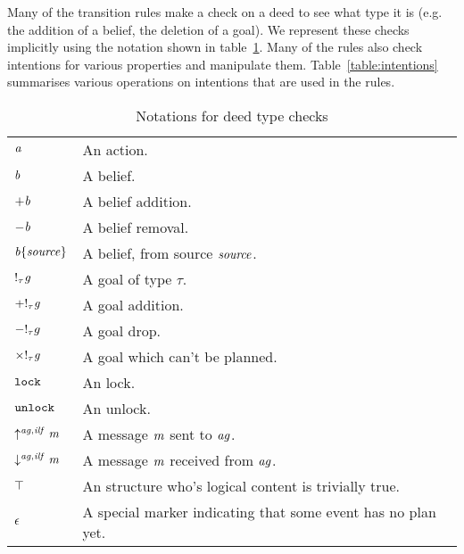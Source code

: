Many of the transition rules make a check on a deed to see what type
it is (e.g. the addition of a belief, the deletion of a goal).  We
represent these checks implicitly using the notation shown in table~\ref{table:deeds}.  Many of the rules also check intentions for various properties and manipulate them.  Table~\ref{table:intentions} summarises various operations on intentions that are used in the rules.

\begin{table}
\begin{tabular}{ll} \hline
$\mathit{a}$ & An action. \\

$\mathit{b}$ & A belief. \\

$+\mathit{b}$ & A belief addition. \\

$-\mathit{b}$ & A belief removal. \\

$\mathit{b}\{\mathit{source}\}$ & A belief, from source $\mathit{source}$. \\

$!_{\tau}\mathit{g}$ & A goal of type $\tau$\index{goal type}. \\

$\mathit{+!_{\tau}g}$ & A goal addition. \\

$\mathit{-!}_{\tau}{g}$ & A goal drop. \\

$\mathit{\times!_{\tau}g}$ & A goal which can't be planned. \\

${\tt lock}$ & An lock. \\

${\tt unlock}$ & An unlock. \\

$\mathit{\uparrow^{\mathit{ag},\mathit{ilf}}\mathit{m}}$ & A message $\mathit{m}$ sent
to $\mathit{ag}$. \\

$\mathit{\downarrow^{\mathit{ag},\mathit{ilf}}\mathit{m}}$ & A message $\mathit{m}$ received
from $\mathit{ag}$. \\

$\top$ & An structure who's logical content is trivially
true. \\

$\epsilon$ & A special marker indicating that some event has no plan yet. \\ \hline

\end{tabular}
\caption{Notations for deed type checks}
\label{table:deeds}
\end{table}


